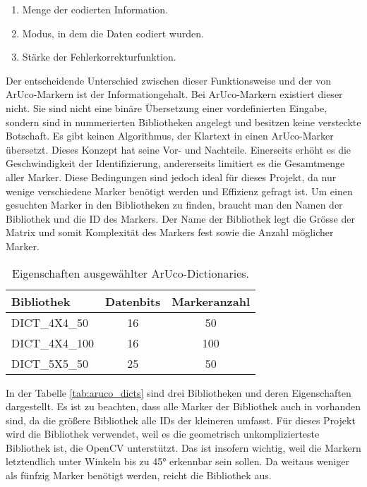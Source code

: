 \begin{enumerate}
    \item Menge der codierten Information.
    \item Modus, in dem die Daten codiert wurden.
    \item Stärke der Fehlerkorrekturfunktion.
\end{enumerate}

Der entscheidende Unterschied zwischen dieser Funktionsweise und der von ArUco-Markern ist der Informationgehalt. Bei ArUco-Markern existiert dieser nicht. Sie sind nicht eine binäre Übersetzung einer vordefinierten Eingabe, sondern sind in nummerierten Bibliotheken angelegt und besitzen keine versteckte Botschaft. Es gibt keinen Algorithmus, der Klartext in einen ArUco-Marker übersetzt. Dieses Konzept hat seine Vor- und Nachteile. Einerseits erhöht es die Geschwindigkeit der Identifizierung, andererseits limitiert es die Gesamtmenge aller Marker. Diese Bedingungen sind jedoch ideal für dieses Projekt, da nur wenige verschiedene Marker benötigt werden und Effizienz gefragt ist. 
Um einen gesuchten Marker in den Bibliotheken zu finden, braucht man den Namen der Bibliothek und die ID des Markers. Der Name der Bibliothek legt die Grösse der Matrix und somit Komplexität des Markers fest sowie die Anzahl möglicher Marker.

\begin{table}[H]
    \centering
    \begin{tabular}{lcc}
        \toprule
        \textbf{Bibliothek} & \textbf{Datenbits} & \textbf{Markeranzahl} \\
        \midrule
        DICT\_4X4\_50 & 16 & 50 \\
        DICT\_4X4\_100 & 16 & 100 \\
        DICT\_5X5\_50 & 25 & 50 \\
        \bottomrule
    \end{tabular}
    \caption{Eigenschaften ausgewählter ArUco-Dictionaries.}
        \label{tab:aruco_dicts}
\end{table}

In der Tabelle \autoref{tab:aruco_dicts} sind drei Bibliotheken und deren Eigenschaften dargestellt. Es ist zu beachten, dass alle Marker der Bibliothek  auch in  vorhanden sind, da die größere Bibliothek alle IDs der kleineren umfasst. Für dieses Projekt wird die Bibliothek  verwendet, weil es die geometrisch unkomplizierteste Bibliothek ist, die OpenCV unterstützt. Das ist insofern wichtig, weil die Markern letztendlich unter Winkeln bis zu 45° erkennbar sein sollen. Da weitaus weniger als fünfzig Marker benötigt werden, reicht die  Bibliothek aus.

